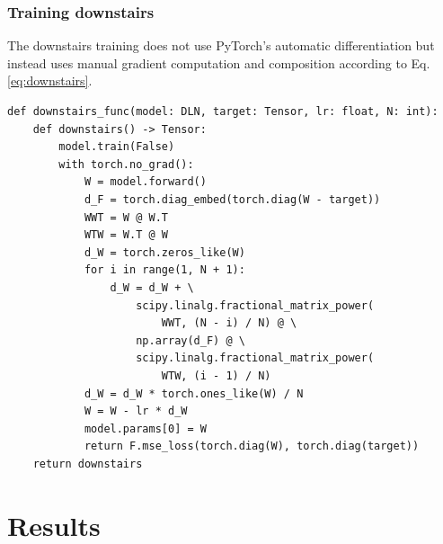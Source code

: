 \documentclass[11pt]{article}
\begin{document}
\subsubsection{Training downstairs}
The downstairs training does not use PyTorch's automatic differentiation but instead uses manual gradient computation and composition according to Eq. \ref {eq:downstairs}.
\begin{verbatim}
def downstairs_func(model: DLN, target: Tensor, lr: float, N: int):
    def downstairs() -> Tensor:
        model.train(False)
        with torch.no_grad():
            W = model.forward()
            d_F = torch.diag_embed(torch.diag(W - target))
            WWT = W @ W.T
            WTW = W.T @ W
            d_W = torch.zeros_like(W)
            for i in range(1, N + 1):
                d_W = d_W + \
                    scipy.linalg.fractional_matrix_power(
                        WWT, (N - i) / N) @ \
                    np.array(d_F) @ \
                    scipy.linalg.fractional_matrix_power(
                        WTW, (i - 1) / N)
            d_W = d_W * torch.ones_like(W) / N
            W = W - lr * d_W
            model.params[0] = W
            return F.mse_loss(torch.diag(W), torch.diag(target))
    return downstairs
\end{verbatim}

\pagebreak

\section{Results}
\end{document}

